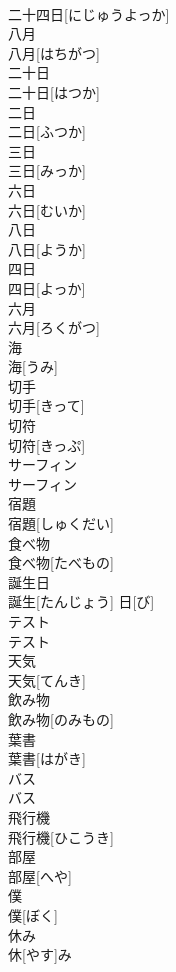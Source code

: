 \documentclass[8pt]{extreport}
\begin{document}
\begin{CJK}{UTF8}{min}
\\	二十四日[にじゅうよっか]
\\	八月	
\\	八月[はちがつ]
\\	二十日	
\\	二十日[はつか]
\\	二日	
\\	二日[ふつか]
\\	三日	
\\	三日[みっか]
\\	六日	
\\	六日[むいか]
\\	八日	
\\	八日[ようか]
\\	四日	
\\	四日[よっか]
\\	六月	
\\	六月[ろくがつ]
\\	海	
\\	海[うみ]
\\	切手	
\\	切手[きって]
\\	切符	
\\	切符[きっぷ]
\\	サーフィン	
\\	サーフィン
\\	宿題	
\\	宿題[しゅくだい]
\\	食べ物	
\\	食べ物[たべもの]
\\	誕生日	
\\	誕生[たんじょう] 日[び]
\\	テスト	
\\	テスト
\\	天気	
\\	天気[てんき]
\\	飲み物	
\\	飲み物[のみもの]
\\	葉書	
\\	葉書[はがき]
\\	バス	
\\	バス
\\	飛行機	
\\	飛行機[ひこうき]
\\	部屋	
\\	部屋[へや]
\\	僕	
\\	僕[ぼく]
\\	休み	
\\	休[やす]み

\end{CJK}
\end{document}
